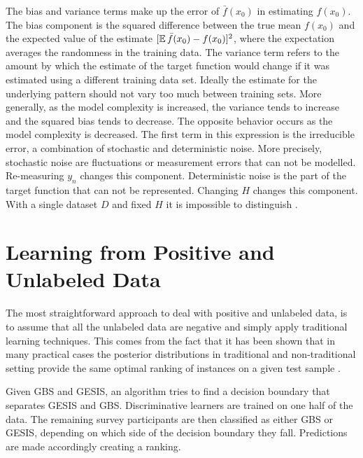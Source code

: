 The bias and variance terms make up the error of \(\bar{f}(x_0)\) in estimating \(f(x_0)\). The bias component is the squared difference between the true mean \(f(x_0)\) and the expected value of the estimate \([\operatorname{\mathbb{E}}\bar{f}(x_0) - f(x_0)]^2\), where the expectation averages the randomness in the training data. The variance term refers to the amount by which the estimate of the target function would change if it was estimated using a different training data set. Ideally the estimate for the underlying pattern should not vary too much between training sets. More generally, as the model complexity is increased, the variance tends to increase and the squared bias tends to decrease. The opposite behavior occurs as the model complexity is decreased. The first term in this expression is the irreducible error, a combination of stochastic and deterministic noise. More precisely, stochastic noise are fluctuations or measurement errors that can not be modelled. Re-measuring \(y_n\) changes this component. Deterministic noise is the part of the target function that can not be represented. Changing \(H\) changes this component. With a single dataset \(D\) and fixed \(H\) it is impossible to distinguish \cite{yaser}.  

\section{Learning from Positive and Unlabeled Data}

The most straightforward approach to deal with positive and unlabeled data, is to assume that all the unlabeled data are negative and simply apply traditional learning techniques. This comes from the fact that it has been shown that in many practical cases the posterior distributions in traditional and non-traditional setting provide the same optimal ranking of instances on a given test sample \cite{jain}.

Given GBS and GESIS, an algorithm tries to find a decision boundary that separates GESIS and GBS. Discriminative learners are trained on one half of the data. The remaining survey participants are then classified as either GBS or GESIS, depending on which side of the decision boundary they fall. Predictions are made accordingly creating a ranking. 

